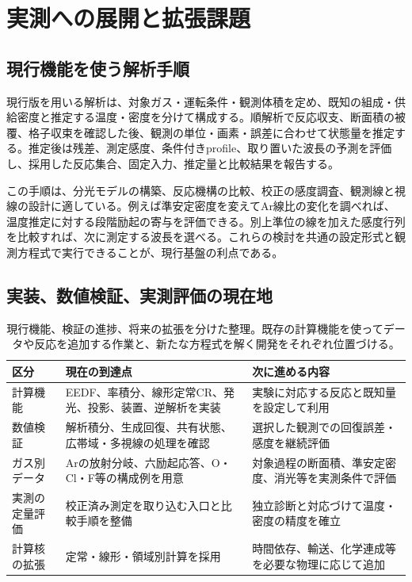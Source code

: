 \section{実測への展開と拡張課題}
\label{sec:outlook}
\subsection{現行機能を使う解析手順}
現行版を用いる解析は、対象ガス・運転条件・観測体積を定め、既知の組成・供給密度と推定する温度・密度を分けて構成する。順解析で反応収支、断面積の被覆、格子収束を確認した後、観測の単位・画素・誤差に合わせて状態量を推定する。推定後は残差、測定感度、条件付きprofile、取り置いた波長の予測を評価し、採用した反応集合、固定入力、推定量と比較結果を報告する。

この手順は、分光モデルの構築、反応機構の比較、校正の感度調査、観測線と視線の設計に適している。例えば準安定密度を変えてAr線比の変化を調べれば、温度推定に対する段階励起の寄与を評価できる。別上準位の線を加えた感度行列を比較すれば、次に測定する波長を選べる。これらの検討を共通の設定形式と観測方程式で実行できることが、現行基盤の利点である。

\subsection{実装、数値検証、実測評価の現在地}
\begin{table}[htbp]
\centering\small
\begin{tabularx}{\linewidth}{p{29mm}YY}
\toprule
区分 & 現在の到達点 & 次に進める内容 \\
\midrule
計算機能 & EEDF、率積分、線形定常CR、発光、投影、装置、逆解析を実装 & 実験に対応する反応と既知量を設定して利用 \\
数値検証 & 解析積分、生成回復、共有状態、広帯域・多視線の処理を確認 & 選択した観測での回復誤差・感度を継続評価 \\
ガス別データ & Arの放射分岐、六励起応答、O・Cl・F等の構成例を用意 & 対象過程の断面積、準安定密度、消光等を実測条件で評価 \\
実測の定量評価 & 校正済み測定を取り込む入口と比較手順を整備 & 独立診断と対応づけて温度・密度の精度を確立 \\
計算核の拡張 & 定常・線形・領域別計算を採用 & 時間依存、輸送、化学連成等を必要な物理に応じて追加 \\
\bottomrule
\end{tabularx}
\caption{現行機能、検証の進捗、将来の拡張を分けた整理。既存の計算機能を使ってデータや反応を追加する作業と、新たな方程式を解く開発をそれぞれ位置づける。}
\label{tab:status}
\end{table}

